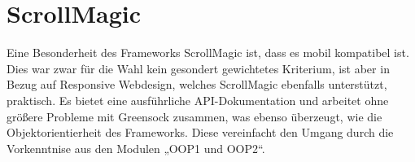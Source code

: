 \section{ScrollMagic}
Eine Besonderheit des Frameworks ScrollMagic ist, dass es mobil kompatibel ist. Dies war zwar für die Wahl kein gesondert gewichtetes Kriterium, ist aber in Bezug auf Responsive Webdesign, welches ScrollMagic ebenfalls unterstützt, praktisch. Es bietet eine ausführliche API-Dokumentation und arbeitet ohne größere Probleme mit Greensock zusammen, was ebenso überzeugt, wie die Objektorientierheit des Frameworks. Diese vereinfacht den Umgang durch die Vorkenntnise aus den Modulen „OOP1 und OOP2“.
